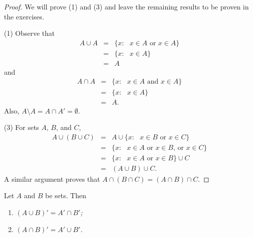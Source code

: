 \begin{proof}
We will prove (1) and (3) and leave the remaining results to be proven in the exercises. 

(1)
Observe that
\begin{eqnarray*}
A \cup A & = & \{ x : \mbox{ $x \in A$ or $x \in A$} \} \\
& = & \{ x : \mbox{ $x \in A$} \} \\
& = & A
\end{eqnarray*}
and
\begin{eqnarray*}
A \cap A & = & \{ x : \mbox{ $x \in A$ and $x \in A$} \} \\
& = & \{ x : \mbox{ $x \in A$}  \} \\
& = & A.
\end{eqnarray*}
Also, $A \setminus A = A \cap A' = \emptyset$.
 
(3)
For sets $A$, $B$, and $C$,
\begin{eqnarray*}
A \cup (B \cup C)
& = &
A \cup \{ x : \mbox{ $x \in B$ or $x \in C$} \} \\
& = &
\{ x : \mbox{ $x \in A$ or $x \in B$, or $x \in C$} \} \\
& = &
\{ x : \mbox{ $x \in A$ or $x \in B$} \} \cup C \\
& = &
(A \cup B) \cup C.
\end{eqnarray*}
A  similar argument proves that  $A \cap (B \cap C) = (A \cap B) \cap
C$. 
\end{proof}




\begin{theorem}\label{sets_theorem_de_morgan}
Let $A$ and $B$ be sets. Then 
\begin{enumerate}
 
\rm \item \it
$(A \cup B)' = A' \cap B'$; 
 
\rm \item \it
$(A \cap B)' = A' \cup B'$.
 
\end{enumerate}
\end{theorem}
 
